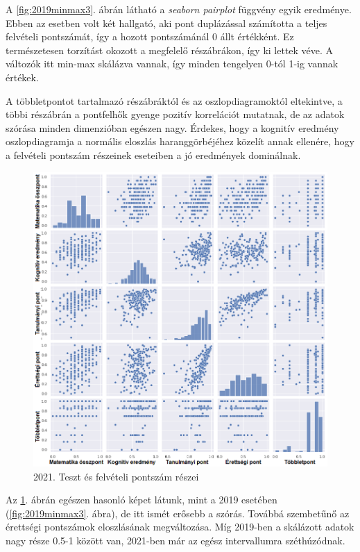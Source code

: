 \documentclass[12pt]{article}
\begin{document}
A \ref{fig:2019minmax3}. ábrán látható a \textit{seaborn pairplot} függvény egyik eredménye. Ebben az esetben volt két hallgató, aki pont duplázással számította a teljes felvételi pontszámát, így a hozott pontszámánál 0 állt értékként. Ez természetesen torzítást okozott a megfelelő részábrákon, így ki lettek véve. A változók itt min-max skálázva vannak, így minden tengelyen 0-tól 1-ig vannak értékek.

A többletpontot tartalmazó részábráktól és az oszlopdiagramoktól eltekintve, a többi részábrán a pontfelhők gyenge pozitív korrelációt mutatnak, de az adatok szórása minden dimenzióban egészen nagy. Érdekes, hogy a kognitív eredmény oszlopdiagramja a normális eloszlás haranggörbéjéhez közelít annak ellenére, hogy a felvételi pontszám részeinek eseteiben a jó eredmények dominálnak.

\begin{figure}[H]
\centering
\includegraphics[width=\textwidth]{kepek/2021minmax3.png}
\caption{2021. Teszt és felvételi pontszám részei}
\label{fig:2021minmax3}
\end{figure}

Az \ref{fig:2021minmax3}. ábrán egészen hasonló képet látunk, mint a 2019 esetében (\ref{fig:2019minmax3}. ábra), de itt ismét erősebb a szórás. Továbbá szembetűnő az érettségi pontszámok eloszlásának megváltozása. Míg 2019-ben a skálázott adatok nagy része 0.5-1 között van, 2021-ben már az egész intervallumra széthúzódnak. 
\end{document}
